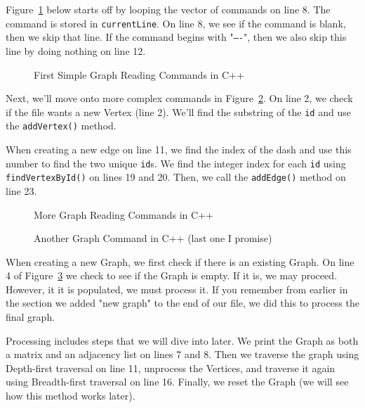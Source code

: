 \documentclass[letterpaper, 10pt,DIV=13]{scrartcl}
\numberwithin{equation}{section} %
\numberwithin{figure}{section} %
\numberwithin{table}{section} %
\begin{document}
Figure~\ref{figure:SkipCommands} below starts off by looping the vector of commands on line 8. The command is stored in \texttt{currentLine}. On line 8, we see if the command is blank, then we skip that line. If the command begins with "\texttt{----}", then we also skip this line by doing nothing on line 12.

\begin{figure}[h] 
    \centering 
    
    \caption{First Simple Graph Reading Commands in C++}
    \label{figure:SkipCommands}
\end{figure}

\pagebreak


Next, we'll move onto more complex commands in Figure~\ref{figure:NewVertexEdge}. On line 2, we check if the file wants a new Vertex (line 2). We'll find the substring of the \texttt{id} and use the \texttt{addVertex()} method.

When creating a new edge on line 11, we find the index of the dash and use this number to find the two unique \texttt{id}s. We find the integer index for each \texttt{id} using \texttt{findVertexById()} on lines 19 and 20. Then, we call the \texttt{addEdge()} method on line 23.

\begin{figure}[h] 
    \centering 
    
    \caption{More Graph Reading Commands in C++}
    \label{figure:NewVertexEdge}
\end{figure}


\begin{figure}[h] 
    \centering 
    
    \caption{Another Graph Command in C++ (last one I promise)}
    \label{figure:NewGraph}
\end{figure}



When creating a new Graph, we first check if there is an existing Graph. On line 4 of Figure~\ref{figure:NewGraph} we check to see if the Graph is empty. If it is, we may proceed. However, it it is populated, we must process it. If you remember from earlier in the section we added "new graph" to the end of our file, we did this to process the final graph.

\pagebreak

Processing includes steps that we will dive into later. We print the Graph as both a matrix and an adjacency list on lines 7 and 8. Then we traverse the graph using Depth-first traversal on line 11, unprocess the Vertices, and traverse it again using Breadth-first traversal on line 16. Finally, we reset the Graph (we will see how this method works later).
\end{document}
